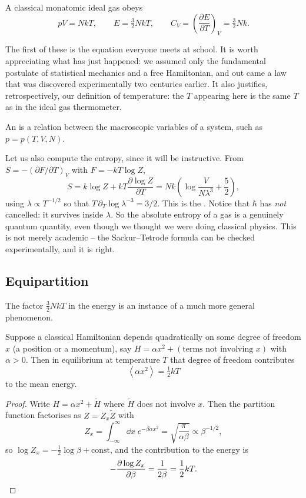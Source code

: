 \documentclass[a4paper]{scrartcl}
\newcommand{\avg}[1]{\left\langle #1 \right\rangle}
\begin{document}
\begin{proposition}
	A classical monatomic ideal gas obeys
	$$
	pV = NkT, \qquad E = \tfrac 32 NkT, \qquad C_V = \left(\frac{\partial E}{\partial T}\right)_V = \tfrac 32 Nk.
	$$
\end{proposition}

The first of these is the equation everyone meets at school. It is worth appreciating what has just happened: we assumed only the fundamental postulate of statistical mechanics and a free Hamiltonian, and out came a law that was discovered experimentally two centuries earlier. It also justifies, retrospectively, our definition of temperature: the $T$ appearing here is the same $T$ as in the ideal gas thermometer.

\begin{definition}
	An  is a relation between the macroscopic variables of a system, such as $p = p(T,V,N)$.
\end{definition}

Let us also compute the entropy, since it will be instructive. From $S = -(\partial F/\partial T)_V$ with $F = -kT\log Z$,
$$
S = k\log Z + kT \frac{\partial \log Z}{\partial T} = Nk\left(\log\frac{V}{N\lambda^3} + \frac 52\right),
$$
using $\lambda \propto T^{-1/2}$ so that $T\,\partial_T \log \lambda^{-3} = 3/2$. This is the . Notice that $\hbar$ has \emph{not} cancelled: it survives inside $\lambda$. So the absolute entropy of a gas is a genuinely quantum quantity, even though we thought we were doing classical physics. This is not merely academic -- the Sackur--Tetrode formula can be checked experimentally, and it is right.

\subsection{Equipartition}

The factor $\tfrac 32 NkT$ in the energy is an instance of a much more general phenomenon.

\begin{proposition}
	Suppose a classical Hamiltonian depends quadratically on some degree of freedom $x$ (a position or a momentum), say $H = \alpha x^2 + (\text{terms not involving } x)$ with $\alpha > 0$. Then in equilibrium at temperature $T$ that degree of freedom contributes
	$$
	\avg{\alpha x^2} = \tfrac 12 kT
	$$
	to the mean energy.
\end{proposition}
\begin{proof}
	Write $H = \alpha x^2 + \tilde H$ where $\tilde H$ does not involve $x$. Then the partition function factorises as $Z = Z_x \tilde Z$ with
	$$
	Z_x = \int_{-\infty}^\infty \dd x \; e^{-\beta\alpha x^2} = \sqrt{\frac{\pi}{\alpha\beta}} \propto \beta^{-1/2},
	$$
	so $\log Z_x = -\tfrac 12 \log\beta + \text{const}$, and the contribution to the energy is
	$$
	-\frac{\partial \log Z_x}{\partial \beta} = \frac{1}{2\beta} = \frac 12 kT. \qedhere
	$$
\end{proof}
\end{document}
